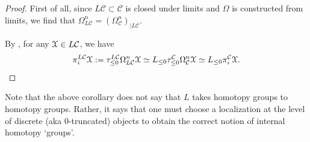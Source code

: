 \begin{proof}
  First of all, since $L\mathcal{C}\subset\mathcal{C}$ is closed under limits and $\Omega$ is constructed from limits, we find that $\Omega_{L\mathcal{C}}^n=(\Omega^n_\mathcal{C})_{|L\mathcal{C}}$.
  
  
  By , for any $\EuScript{X}\in L\mathcal{C}$, we have $$\pi_i^{L\mathcal{C}}\EuScript{X}:=\tau^{L\mathcal{C}}_{\leq 0}\Omega^n_{L\mathcal{C}}\EuScript{X}\simeq L_{\leq 0}\tau^{\mathcal{C}}_{\leq 0}\Omega_\mathcal{C}^n\EuScript{X}\simeq L_{\leq 0} \pi_i^{\mathcal{C}}\EuScript{X}.$$
\end{proof}
\begin{rem}
Note that the above corollary does not say that $L$ takes homotopy groups to homotopy groups. Rather, it says that one must choose a localization at the level of discrete (aka $0$-truncated) objects to obtain the correct notion of internal homotopy `groups'.
\end{rem}

